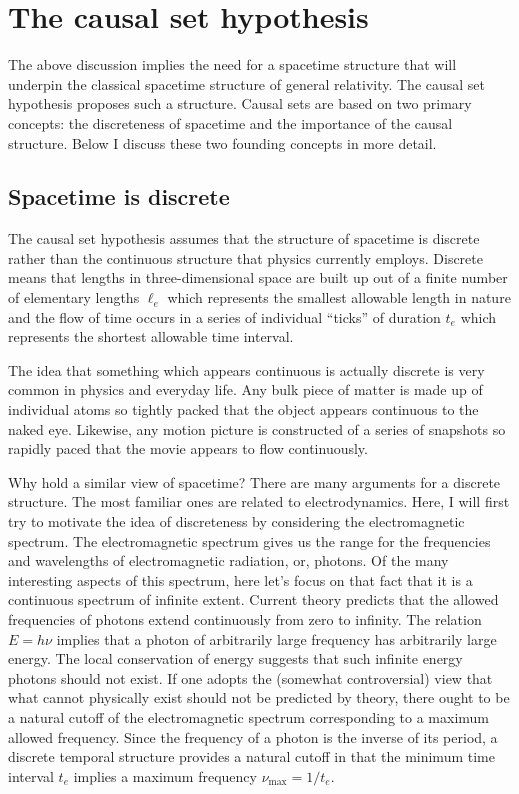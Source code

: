 \section{The causal set hypothesis}

The above discussion implies the need for a spacetime structure that will
underpin the classical spacetime structure of general relativity. The causal
set hypothesis proposes such a structure. Causal sets are based on two
primary concepts: the discreteness of spacetime and the importance of the
causal structure. Below I discuss these two founding concepts in more detail.

\subsection{Spacetime is discrete}

The causal set hypothesis assumes that the structure of spacetime is
discrete rather than the continuous structure that physics currently
employs. Discrete means that lengths in three-dimensional space are built up
out of a finite number of elementary lengths $\ell _e$ which represents the
smallest allowable length in nature and the flow of time occurs in a series
of individual ``ticks'' of duration $t_e$ which represents the shortest
allowable time interval.

The idea that something which appears continuous is actually discrete is
very common in physics and everyday life. Any bulk piece of matter is made
up of individual atoms so tightly packed that the object appears continuous
to the naked eye. Likewise, any motion picture is constructed of a series of
snapshots so rapidly paced that the movie appears to flow continuously.

Why hold a similar view of spacetime? There are many arguments for a
discrete structure. The most familiar ones are related to electrodynamics.
Here, I will first try to motivate the idea of discreteness by considering
the electromagnetic spectrum. The electromagnetic spectrum gives us the
range for the frequencies and wavelengths of electromagnetic radiation, or,
photons. Of the many interesting aspects of this spectrum, here let's focus
on that fact that it is a continuous spectrum of infinite extent. Current
theory predicts that the allowed frequencies of photons extend continuously
from zero to infinity. The relation $E=h\nu $ implies that a photon of
arbitrarily large frequency has arbitrarily large energy. The local
conservation of energy suggests that such infinite energy photons should not
exist. If one adopts the (somewhat controversial) view that what cannot
physically exist should not be predicted by theory, there ought to be a
natural cutoff of the electromagnetic spectrum corresponding to a maximum
allowed frequency. Since the frequency of a photon is the inverse of its
period, a discrete temporal structure provides a natural cutoff in that the
minimum time interval $t_e$ implies a maximum frequency $\nu _{\max }=1/t_e$.

